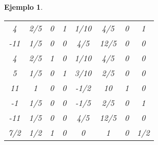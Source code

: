 \documentclass[11pt]{report}
\theoremstyle{mytheorem}
\theoremstyle{mydefinition}
\theoremstyle{myexample}
\newtheorem*{example}{Ejemplo}
\begin{document}
\begin{example}
\begin{center}
\begin{tabular}{|c|c|c|c|c|c|c|c|}
    \phantom{-}4 & \multicolumn{1}{c}{\phantom{-}2/5} & \multicolumn{1}{c}{\phantom{-}0} & \multicolumn{1}{c}{\phantom{-}1} & \multicolumn{1}{c}{\phantom{-}1/10} & \multicolumn{1}{c}{\phantom{-}4/5} & \multicolumn{1}{c}{0} & \multicolumn{1}{c|}{\phantom{-}1} \\ \cline{1-8}
    
    -11 & \multicolumn{1}{c}{\phantom{-}1/5} & \multicolumn{1}{c}{\phantom{-}0} & \multicolumn{1}{c}{\phantom{-}0} & \multicolumn{1}{c}{\phantom{-}4/5} & \multicolumn{1}{c}{\phantom{-}12/5} & \multicolumn{1}{c}{0} & \multicolumn{1}{c|}{\phantom{-}0} \\ \hhline{|=|=|=|=|=|=|=|=|}

    \phantom{-}4 & \multicolumn{1}{c}{\phantom{-}2/5} & \multicolumn{1}{c}{\phantom{-}1} & \multicolumn{1}{c}{\phantom{-}0} & \multicolumn{1}{c}{\phantom{-}1/10}& \multicolumn{1}{c}{\phantom{-}4/5} & \multicolumn{1}{c}{0} & \multicolumn{1}{c|}{\phantom{-}0} \\

    \phantom{-}5 & \multicolumn{1}{c}{\phantom{-}1/5} & \multicolumn{1}{c}{\phantom{-}0} & \multicolumn{1}{c}{\phantom{-}1} & \multicolumn{1}{c}{\phantom{-}3/10}& \multicolumn{1}{c}{\phantom{-}2/5} & \multicolumn{1}{c}{0} & \multicolumn{1}{c|}{\phantom{-}0} \\
    
    \phantom{-}11 & \multicolumn{1}{c}{\phantom{-}1} & \multicolumn{1}{c}{\phantom{-}0} & \multicolumn{1}{c}{\phantom{-}0} & \multicolumn{1}{c}{-1/2}& \multicolumn{1}{c}{\phantom{-}10} & \multicolumn{1}{c}{1} & \multicolumn{1}{c|}{\phantom{-}0} \\
    
    -1 & \multicolumn{1}{c}{\phantom{-}1/5} & \multicolumn{1}{c}{\phantom{-}0} & \multicolumn{1}{c}{\phantom{-}0} & \multicolumn{1}{c}{-1/5} & \multicolumn{1}{c}{\phantom{-}2/5} & \multicolumn{1}{c}{0} & \multicolumn{1}{c|}{\phantom{-}1} \\ \cline{1-8}
    
    -11 & \multicolumn{1}{c}{\phantom{-}1/5} & \multicolumn{1}{c}{\phantom{-}0} & \multicolumn{1}{c}{\phantom{-}0} & \multicolumn{1}{c}{\phantom{-}4/5} & \multicolumn{1}{c}{\phantom{-}12/5} & \multicolumn{1}{c}{0} & \multicolumn{1}{c|}{\phantom{-}0} \\ \hhline{|=|=|=|=|=|=|=|=|}
    
    \phantom{-}7/2 & \multicolumn{1}{c}{\phantom{-}1/2} & \multicolumn{1}{c}{\phantom{-}1} & \multicolumn{1}{c}{\phantom{-}0} & \multicolumn{1}{c}{\phantom{-}0}& \multicolumn{1}{c}{\phantom{-}1} & \multicolumn{1}{c}{0} & \multicolumn{1}{c|}{\phantom{-}1/2} \\


\end{tabular}
\end{center}
\end{example}
\end{document}
